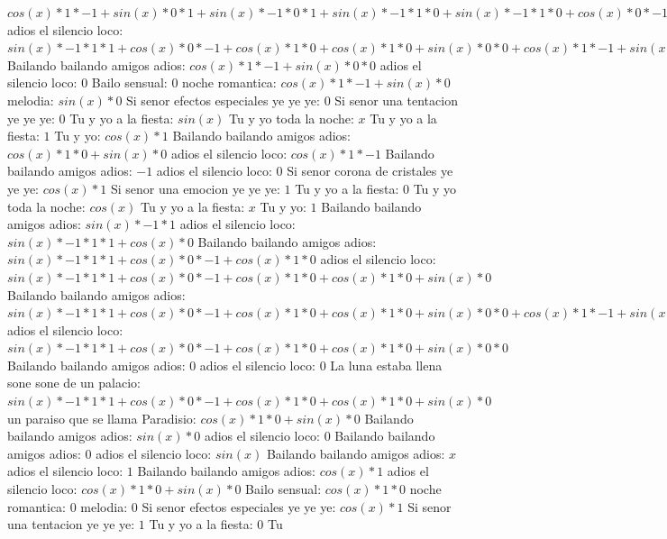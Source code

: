 \documentclass{article}
\begin{document}
${{{{cos(x)*1*-1+sin(x)*0}*1+sin(x)*-1*0}*1+sin(x)*-1*1*0+sin(x)*-1*1*0+cos(x)*0}*-1+{sin(x)*-1*1*1+cos(x)*0}*0+{sin(x)*-1*1*1+cos(x)*0}*0+cos(x)*1*0+{sin(x)*-1*1*1+cos(x)*0}*0+cos(x)*1*0+cos(x)*1*0+sin(x)*0}*1+{{sin(x)*-1*1*1+cos(x)*0}*-1+cos(x)*1*0+cos(x)*1*0+sin(x)*0}*0+{{sin(x)*-1*1*1+cos(x)*0}*-1+cos(x)*1*0+cos(x)*1*0+sin(x)*0}*0+{cos(x)*1*-1+sin(x)*0}*0$  \newline adios el silencio loco: ${{sin(x)*-1*1*1+cos(x)*0}*-1+cos(x)*1*0+cos(x)*1*0+sin(x)*0}*0+{cos(x)*1*-1+sin(x)*0}*0$  \newline Bailando bailando amigos adios: ${cos(x)*1*-1+sin(x)*0}*0$ adios el silencio loco: $0$ Bailo sensual: $0$  \newline noche romantica: $cos(x)*1*-1+sin(x)*0$  \newline melodia: $sin(x)*0$ Si senor efectos especiales ye ye ye: $0$ Si senor una tentacion ye ye ye: $0$  \newline Tu y yo a la fiesta: $sin(x)$  \newline Tu y yo toda la noche: $x$ Tu y yo a la fiesta: $1$  \newline Tu y yo: $cos(x)*1$ Bailando bailando amigos adios: $cos(x)*1*0+sin(x)*0$ adios el silencio loco: $cos(x)*1*-1$ Bailando bailando amigos adios: $-1$ adios el silencio loco: $0$  \newline Si senor corona de cristales ye ye ye: $cos(x)*1$ Si senor una emocion ye ye ye: $1$ Tu y yo a la fiesta: $0$  \newline Tu y yo toda la noche: $cos(x)$  \newline Tu y yo a la fiesta: $x$ Tu y yo: $1$  \newline Bailando bailando amigos adios: $sin(x)*-1*1$ adios el silencio loco: $sin(x)*-1*1*1+cos(x)*0$ Bailando bailando amigos adios: ${sin(x)*-1*1*1+cos(x)*0}*-1+cos(x)*1*0$ adios el silencio loco: ${sin(x)*-1*1*1+cos(x)*0}*-1+cos(x)*1*0+cos(x)*1*0+sin(x)*0$ Bailando bailando amigos adios: ${{sin(x)*-1*1*1+cos(x)*0}*-1+cos(x)*1*0+cos(x)*1*0+sin(x)*0}*0+{cos(x)*1*-1+sin(x)*0}*0$ adios el silencio loco: ${{sin(x)*-1*1*1+cos(x)*0}*-1+cos(x)*1*0+cos(x)*1*0+sin(x)*0}*0$ Bailando bailando amigos adios: $0$ adios el silencio loco: $0$  \newline La luna estaba llena sone sone de un palacio: ${sin(x)*-1*1*1+cos(x)*0}*-1+cos(x)*1*0+cos(x)*1*0+sin(x)*0$  \newline un paraiso que se llama Paradisio: $cos(x)*1*0+sin(x)*0$  \newline Bailando bailando amigos adios: $sin(x)*0$ adios el silencio loco: $0$ Bailando bailando amigos adios: $0$  \newline adios el silencio loco: $sin(x)$  \newline Bailando bailando amigos adios: $x$ adios el silencio loco: $1$  \newline Bailando bailando amigos adios: $cos(x)*1$ adios el silencio loco: $cos(x)*1*0+sin(x)*0$ Bailo sensual: $cos(x)*1*0$ noche romantica: $0$ melodia: $0$  \newline Si senor efectos especiales ye ye ye: $cos(x)*1$ Si senor una tentacion ye ye ye: $1$ Tu y yo a la fiesta: $0$  \newline Tu 
\end{document}
